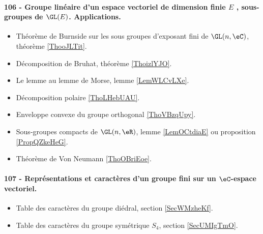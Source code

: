 \paragraph{106 - Groupe linéaire d’un espace vectoriel de dimension finie $E$ , sous-groupes de $\GL(E)$. Applications.}
\begin{itemize}
    \item Théorème de Burnside sur les sous groupes d'exposant fini de \( \GL(n,\eC)\), théorème \ref{ThooJLTit}.
    \item Décomposition de Bruhat, théorème \ref{ThoizlYJO}.
    \item Le lemme au lemme de Morse, lemme \ref{LemWLCvLXe}.
    \item Décomposition polaire \ref{ThoLHebUAU}.
    \item Enveloppe convexe du groupe orthogonal \ref{ThoVBzqUpy}.
    \item Sous-groupes compacts de \( \GL(n,\eR)\), lemme \ref{LemOCtdiaE} ou proposition \ref{PropQZkeHeG}.
    \item Théorème de Von Neumann \ref{ThoOBriEoe}.
\end{itemize}

\paragraph{107 - Représentations et caractères d’un groupe fini sur un \( \eC\)-espace vectoriel.}
\begin{itemize}
    \item Table des caractères du groupe diédral, section \ref{SecWMzheKf}.
    \item Table des caractères du groupe symétrique \( S_4\), section \ref{SecUMIgTmO}.
\end{itemize}
